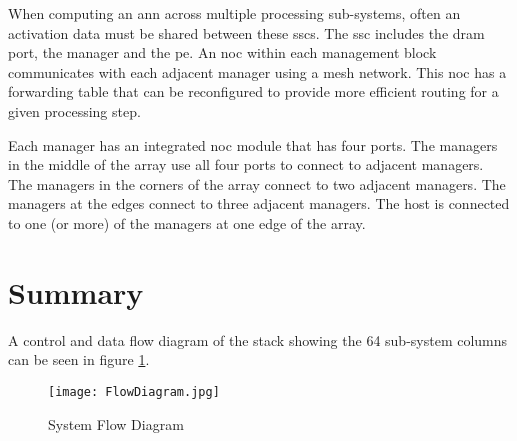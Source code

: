 \iffalse
\begin{figure}[!t]
\centering
\captionsetup{justification=centering}
\captionsetup{width=.75\linewidth}
\centerline{
\mbox{\texttt{[image: nocpacket]}}
}
\vspace{0pt}
\caption{\ac{noc} packet format}
\label{fig:NoC packet format}
\end{figure}
\fi


When computing an \ac{ann} across multiple processing sub-systems, often \ac{an} activation data must be shared between these \ac{ssc}s. The \ac{ssc} includes the \ac{dram} port, the manager and the \ac{pe}. 
An \ac{noc} within each management block communicates with each adjacent manager using a mesh network. This \ac{noc} has a forwarding table that can be reconfigured to provide more efficient routing for a given processing step.

Each manager has an integrated \ac{noc} module that has four ports. 
The managers in the middle of the array use all four ports to connect to adjacent managers.
The managers in the corners of the array connect to two adjacent managers.
The managers at the edges connect to three adjacent managers.
The host is connected to one (or more) of the managers at one edge of the array. 

\section{Summary}
\label{sec:Overview Summary}

A control and data flow diagram of the stack showing the 64 sub-system columns can be seen in figure \ref{fig:FlowDiagram}.
\begin{figure}[!t]
\centering
\captionsetup{justification=centering}
\centerline{
\mbox{\texttt{[image: FlowDiagram.jpg]}}
}
\caption{System Flow Diagram}
\label{fig:FlowDiagram}
\end{figure}


